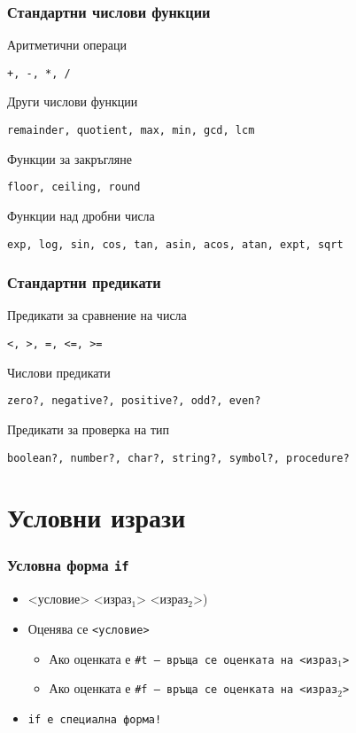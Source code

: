 \documentclass{beamer}
\begin{document}
\begin{frame}
  \frametitle{Стандартни числови функции}

  Аритметични операци

  \tt{+}, \tt{-}, \tt{*}, \tt{/}

  \vspace{1em}
  Други числови функции

  \tt{remainder}, \tt{quotient}, \tt{max}, \tt{min}, \tt{gcd}, \tt{lcm}

  \vspace{1em}
  Функции за закръгляне

  \tt{floor}, \tt{ceiling}, \tt{round}

  \vspace{1em}
  Функции над дробни числа

  \tt{exp}, \tt{log}, \tt{sin}, \tt{cos}, \tt{tan}, \tt{asin}, \tt{acos}, \tt{atan}, \tt{expt}, \tt{sqrt}
\end{frame}

\begin{frame}
  \frametitle{Стандартни предикати}

  Предикати за сравнение на числа

  \tt{<}, \tt{>}, \tt{=}, \tt{<=}, \tt{>=}

  \vspace{1em}
  Числови предикати

  \tt{zero?}, \tt{negative?}, \tt{positive?}, \tt{odd?}, \tt{even?}

  \vspace{1em}
  Предикати за проверка на тип

  \tt{boolean?}, \tt{number?}, \tt{char?}, \tt{string?}, \tt{symbol?}, \tt{procedure?}
\end{frame}

\section{Условни изрази}

\begin{frame}
  \frametitle{Условна форма \tt{if}}

  \begin{itemize}[<+->]
  \item {} <условие> <израз$_1$> <израз$_2$>\tta)
  \item Оценява се \tt{<условие>}
    \begin{itemize}
    \item Ако оценката е \tt{\#t} --- връща се оценката на <израз$_1$>
    \item Ако оценката е \tt{\#f} --- връща се оценката на <израз$_2$>
    \end{itemize}
  \item \alert{\tt{if} е специална форма!}
  \end{itemize}
\end{frame}
\end{document}
